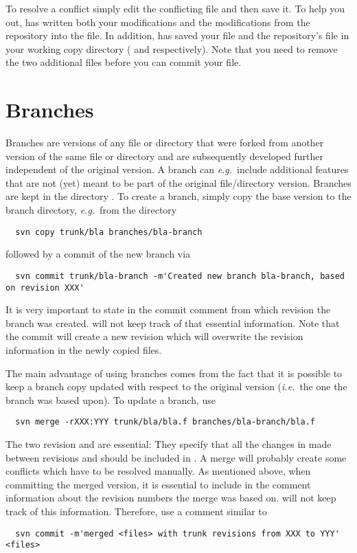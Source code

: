 \documentclass[10pt,a4paper]{simson}
\begin{document}
To resolve a conflict simply edit the conflicting file and then save
it. To help you out,  has written both your
modifications and the modifications from the repository into the
file. In addition,  has saved your file and the
repository's file in your working copy directory ( and
 respectively). Note that you need to remove the two
additional files before you can commit your file.


\section{Branches}
Branches are versions of any file or directory that were forked from
another version of the same file or directory and are subsequently
developed further independent of the original version. A branch can
\emph{e.g.}\ include additional features that are not (yet) meant to be part
of the original file/directory version. Branches are kept in the
directory . To create a branch, simply copy the base
version to the branch directory, \emph{e.g.}\ from the 
directory
\begin{verbatim}
  svn copy trunk/bla branches/bla-branch
\end{verbatim}
followed by a commit of the new branch via
\begin{verbatim}
  svn commit trunk/bla-branch -m'Created new branch bla-branch, based on revision XXX'
\end{verbatim}
It is very important to state in the commit comment from which
revision the branch was created.  will not keep
track of that essential information. Note that the commit will create
a new revision which will overwrite the revision information in the
newly copied files.

The main advantage of using branches comes from the fact that it is
possible to keep a branch copy updated with respect to the original
version (\emph{i.e.}\ the one the branch was based upon). To update a branch,
use
\begin{verbatim}
  svn merge -rXXX:YYY trunk/bla/bla.f branches/bla-branch/bla.f
\end{verbatim}
The two revision  and  are essential: They
specify that all the changes in  made between
revisions  and  should be included in
. A merge will probably create some
conflicts which have to be resolved manually. As mentioned above, when
committing the merged version, it is essential to include in the
comment information about the revision numbers the merge was based
on.  will not keep track of this
information. Therefore, use a comment similar to
\begin{verbatim}
  svn commit -m'merged <files> with trunk revisions from XXX to YYY' <files>
\end{verbatim}
\end{document}
